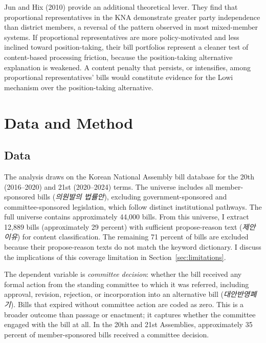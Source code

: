 \documentclass[11pt]{article}
\begin{document}
Jun and Hix (2010) provide an additional theoretical lever. They find that proportional representatives in the KNA demonstrate greater party independence than district members, a reversal of the pattern observed in most mixed-member systems. If proportional representatives are more policy-motivated and less inclined toward position-taking, their bill portfolios represent a cleaner test of content-based processing friction, because the position-taking alternative explanation is weakened. A content penalty that persists, or intensifies, among proportional representatives' bills would constitute evidence for the Lowi mechanism over the position-taking alternative.


\section{Data and Method}\label{sec:data}

\subsection{Data}\label{sec:datasub}

The analysis draws on the Korean National Assembly bill database for the 20th (2016--2020) and 21st (2020--2024) terms. The universe includes all member-sponsored bills (\emph{의원발의 법률안}), excluding government-sponsored and committee-sponsored legislation, which follow distinct institutional pathways. The full universe contains approximately 44,000 bills. From this universe, I extract 12,889 bills (approximately 29 percent) with sufficient propose-reason text (\emph{제안이유}) for content classification. The remaining 71 percent of bills are excluded because their propose-reason texts do not match the keyword dictionary. I discuss the implications of this coverage limitation in Section~\ref{sec:limitations}.

The dependent variable is \emph{committee decision}: whether the bill received any formal action from the standing committee to which it was referred, including approval, revision, rejection, or incorporation into an alternative bill (\emph{대안반영폐기}). Bills that expired without committee action are coded as zero. This is a broader outcome than passage or enactment; it captures whether the committee engaged with the bill at all. In the 20th and 21st Assemblies, approximately 35 percent of member-sponsored bills received a committee decision.
\end{document}

